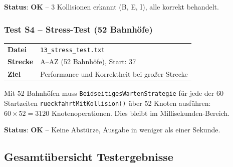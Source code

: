 \documentclass[12pt,a4paper]{article}
\newcommand{\pass}{\textcolor{passgreen}{\textbf{OK}}}
\begin{document}
\textbf{Status}: \pass{} -- 3 Kollisionen erkannt (B, E, I), alle korrekt behandelt.

\subsubsection{Test S4 -- Stress-Test (52 Bahnhöfe)}

\begin{center}
\begin{tabular}{ll}
\toprule
\textbf{Datei} & \texttt{13\_stress\_test.txt} \\
\textbf{Strecke} & A--AZ (52 Bahnhöfe), Start: 37 \\
\textbf{Ziel} & Performance und Korrektheit bei großer Strecke \\
\bottomrule
\end{tabular}
\end{center}

Mit 52 Bahnhöfen muss \texttt{BeidseitigesWartenStrategie} für jede der 60 Startzeiten \texttt{rueckfahrtMitKollision()} über 52 Knoten ausführen: $60 \times 52 = 3120$ Knotenoperationen. Dies bleibt im Millisekunden-Bereich.

\textbf{Status}: \pass{} -- Keine Abstürze, Ausgabe in weniger als einer Sekunde.

\subsection{Gesamtübersicht Testergebnisse}
\end{document}
